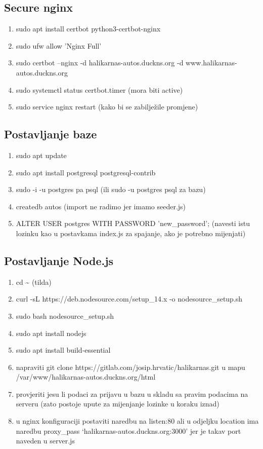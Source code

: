 \begin{flushleft}
    \subsection{Secure nginx}
	   \begin{enumerate}
	        \item sudo apt install certbot python3-certbot-nginx
	        \item sudo ufw allow 'Nginx Full'
	        \item sudo certbot --nginx -d halikarnas-autos.duckns.org -d www.halikarnas-autos.duckns.org
	        \item sudo systemctl status certbot.timer (mora biti active)
	        \item sudo service nginx restart (kako bi se zabilježile promjene)
	   \end{enumerate}
	   
	   \subsection{Postavljanje baze}
	   \begin{enumerate}
	        \item sudo apt update
	        \item sudo apt install postgresql postgresql-contrib
	        \item sudo -i -u postgres pa psql (ili sudo -u postgres psql za bazu)
	        \item createdb autos (import ne radimo jer imamo seeder.js)
	        \item ALTER USER postgres WITH PASSWORD 'new\_password'; (navesti istu lozinku kao u postavkama index.js za spajanje, ako je potrebno mijenjati)
	   \end{enumerate}
	   
	   \subsection{Postavljanje Node.js}
	   \begin{enumerate}
	        \item cd \textasciitilde{} (tilda)
	        \item curl -sL https://deb.nodesource.com/setup\_14.x -o nodesource\_setup.sh
	        \item sudo bash nodesource\_setup.sh
	        \item sudo apt install nodejs
	        \item sudo apt install build-essential
	        \item napraviti git clone https://gitlab.com/josip.hrvatic/halikarnas.git u mapu /var/www/halikarnas-autos.duckns.org/html
	        \item provjeriti jesu li podaci za prijavu u bazu u skladu sa pravim podacima na serveru (zato postoje upute za mijenjanje lozinke u koraku iznad)
	        \item u nginx konfiguraciji postaviti naredbu na listen:80 ali u odjeljku location ima naredbu proxy\_pass ‘halikarnas-autos.duckns.org:3000’ jer je takav port naveden u server.js
	   \end{enumerate}
	   

\end{flushleft}
